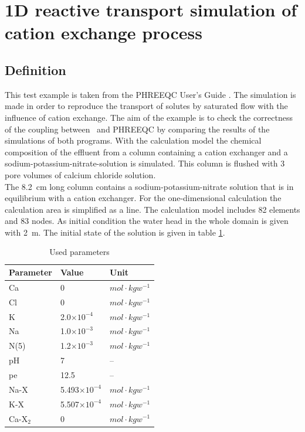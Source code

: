 \section [Cation Exchange (1D)]{1D reactive transport simulation of cation exchange process}
\label{benchmark_1d_cation_exchange}

\subsection{Definition}
This test example is taken from the PHREEQC User's Guide \cite{Parkhurst1999}.   The simulation is made in order to reproduce the transport of solutes by saturated flow with the influence of cation exchange. The aim of the example is to check the correctness of the coupling between \GeoSys~and PHREEQC by comparing the results of the simulations of both programs. With the calculation model the chemical composition of the effluent from a column containing a cation exchanger and a sodium-potassium-nitrate-solution is simulated. This column is flushed with 3 pore volumes of calcium chloride solution.
~~\\
The 8.2~cm long column contains a sodium-potassium-nitrate solution that is in equilibrium with a cation exchanger. For the one-dimensional calculation the calculation area is simplified as a line. The calculation model includes 82 elements and 83 nodes. As initial condition the water head in the whole domain is given with 2~m. The initial state of the solution is given in table \ref{tab:cationex_chem}.

\begin{table}[htbp]
\centering
\caption{Used parameters}
\begin{tabular}{lll}
\hline
Parameter & Value & Unit \\
\hline
Ca & 0 & $mol \cdot kgw^{-1}$ \\
Cl & 0 & $mol \cdot kgw^{-1}$ \\
K & 2.0$\times 10^{-4}$ & $mol \cdot kgw^{-1}$ \\
Na & 1.0$\times 10^{-3}$ & $mol \cdot kgw^{-1}$ \\
N(5) & 1.2$\times 10^{-3}$ & $mol \cdot kgw^{-1}$ \\
pH & 7 & -- \\
pe & 12.5 & -- \\
Na-X & 5.493$\times 10^{-4}$ & $mol \cdot kgw^{-1}$ \\
K-X & 5.507$\times 10^{-4}$ & $mol \cdot kgw^{-1}$ \\
Ca-X$_2$ & 0 & $mol \cdot kgw^{-1}$ \\
\hline
\end{tabular}
\label{tab:cationex_chem}
\end{table}

